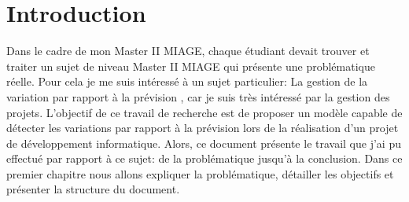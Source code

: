 \chapter{Introduction} %

\label{Chapitre1} %


Dans le cadre de mon Master II MIAGE, chaque étudiant devait trouver et traiter un sujet de niveau \og  Master II MIAGE \fg{} qui présente une problématique réelle.
Pour cela je me suis intéressé à un sujet particulier: \og La gestion de la variation par rapport à la prévision \fg{}, car 
je suis très intéressé par la gestion des projets.  
L'objectif de ce travail de recherche est de proposer un modèle capable de détecter les variations par rapport à la prévision 
lors de la réalisation d'un projet de développement informatique.
Alors, ce document présente le travail que j'ai pu effectué par rapport à ce sujet: de la problématique jusqu'à la conclusion.
Dans ce premier chapitre nous allons expliquer la problématique, détailler les objectifs et présenter la structure du document.

